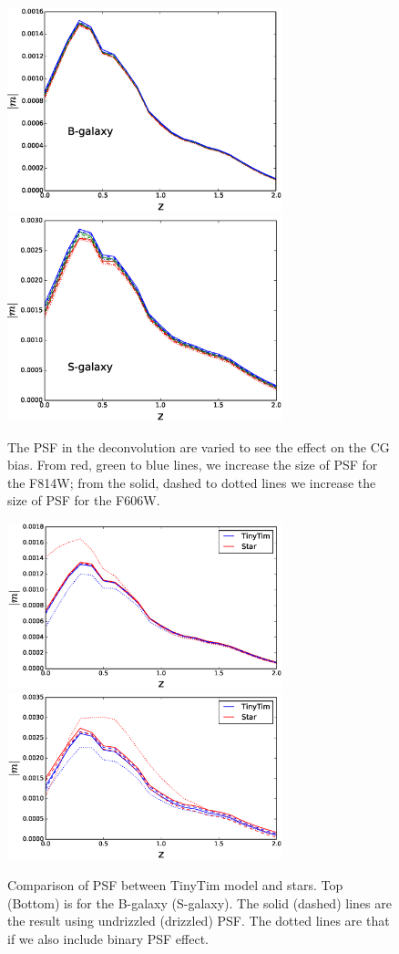 \documentclass[useAMS,usenatbib]{mn2e}
\begin{document}
%
\begin{figure}
\includegraphics[width=8.0cm]{varpsfB.eps}
\includegraphics[width=8.0cm]{varpsfS.eps}
\caption{The PSF in the deconvolution are varied to see the effect on
  the CG bias.  From red, green to blue lines, we increase the size of
  PSF for the F814W; from the solid, dashed to dotted lines we
  increase the size of PSF for the F606W.  }
\label{fig:psfacc1}
\end{figure}
%
\begin{figure}
\includegraphics[width=8.0cm]{ztinytim_b.eps}
\includegraphics[width=8.0cm]{ztinytim_s.eps}
\caption{Comparison of PSF between TinyTim model and stars.
  Top (Bottom) is for the B-galaxy (S-galaxy). The solid (dashed) 
  lines are the result using undrizzled (drizzled) PSF. 
  The dotted lines are that if we also include binary PSF effect.}
\label{fig:psfacc2}
\end{figure}
\end{document}
